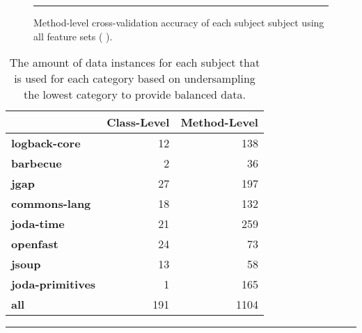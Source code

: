 \begin{figure}[ht!]
  \centering
  \begin{adjustbox}{max size={.95\textwidth}{.95\textheight}}
    
  \end{adjustbox}
  \caption{Method-level cross-validation accuracy of each subject subject using all feature sets (   ).}
  \vspace{1mm}
  \footnotesize{\emph{}}
  \vspace{2mm}
  \hrule
  \label{fig:individual_cross_validation_method_1_2_3_4_graph}
\end{figure}

\begin{table}[ht!]
  \centering
  \begin{threeparttable}
    \begin{tabular}{|l|r|r|}
      \rowcolor[RGB]{169,196,223}
      \hline & \textbf{Class-Level} & \textbf{Method-Level} \\
      \hline \cellcolor[RGB]{169,196,223} \textbf{logback-core} & 12 & 138 \\
      \hline \cellcolor[RGB]{169,196,223} \textbf{barbecue} & 2 & 36 \\
      \hline \cellcolor[RGB]{169,196,223} \textbf{jgap} & 27 & 197 \\
      \hline \cellcolor[RGB]{169,196,223} \textbf{commons-lang} & 18 & 132 \\
      \hline \cellcolor[RGB]{169,196,223} \textbf{joda-time} & 21 & 259 \\
      \hline \cellcolor[RGB]{169,196,223} \textbf{openfast} & 24 & 73 \\
      \hline \cellcolor[RGB]{169,196,223} \textbf{jsoup} & 13 & 58 \\
      \hline \cellcolor[RGB]{169,196,223} \textbf{joda-primitives} & 1 & 165 \\
      \hline \cellcolor[RGB]{169,196,223} \textbf{all} & 191 & 1104 \\
      \hline
    \end{tabular}
  \end{threeparttable}
  \caption{The amount of data instances for each subject that is used for each category based on undersampling the lowest category to provide balanced data.}
  \vspace{2mm}
  \hrule
  \label{tab:experiments_undersampled_data}
\end{table}

